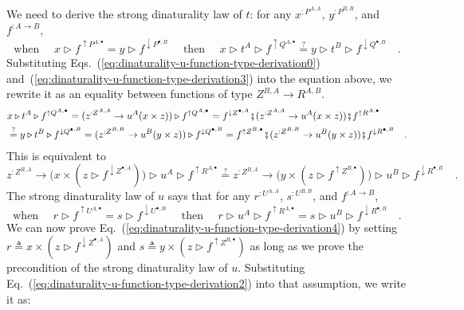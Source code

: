We need to derive the strong dinaturality law of $t$: for any $x^{:P^{A,A}}$,
$y^{:P^{B,B}}$, and $f^{:A\rightarrow B}$,
\[
\text{when }\quad x\triangleright f^{\uparrow P^{A,\bullet}}=y\triangleright f^{\downarrow P^{\bullet,B}}\quad\text{ then }\quad x\triangleright t^{A}\triangleright f^{\uparrow Q^{A,\bullet}}\overset{?}{=}y\triangleright t^{B}\triangleright f^{\downarrow Q^{\bullet,B}}\quad.
\]
Substituting Eqs.~(\ref{eq:dinaturality-u-function-type-derivation0})
and~(\ref{eq:dinaturality-u-function-type-derivation3}) into the
equation above, we rewrite it as an equality between functions of
type $Z^{B,A}\rightarrow R^{A,B}$.
\begin{align*}
 & x\triangleright t^{A}\triangleright f^{\uparrow Q^{A,\bullet}}=(z^{:Z^{A,A}}\rightarrow u^{A}(x\times z))\triangleright f^{\uparrow Q^{A,\bullet}}=f^{\downarrow Z^{\bullet,A}}\bef(z^{:Z^{A,A}}\rightarrow u^{A}(x\times z))\bef f^{\uparrow R^{A,\bullet}}\\
 & \overset{?}{=}y\triangleright t^{B}\triangleright f^{\downarrow Q^{\bullet,B}}=(z^{:Z^{B,B}}\rightarrow u^{B}(y\times z))\triangleright f^{\downarrow Q^{\bullet,B}}=f^{\uparrow Z^{B,\bullet}}\bef(z^{:Z^{B,B}}\rightarrow u^{B}(y\times z))\bef f^{\downarrow R^{\bullet,B}}\quad.
\end{align*}
This is equivalent to
\begin{equation}
z^{:Z^{B,A}}\rightarrow\big(x\times(z\triangleright f^{\downarrow Z^{\bullet,A}})\big)\triangleright u^{A}\triangleright f^{\uparrow R^{A,\bullet}}\overset{?}{=}z^{:Z^{B,A}}\rightarrow\big(y\times(z\triangleright f^{\uparrow Z^{B,\bullet}})\big)\triangleright u^{B}\triangleright f^{\downarrow R^{\bullet,B}}\quad.\label{eq:dinaturality-u-function-type-derivation4}
\end{equation}
The strong dinaturality law of $u$ says that for any $r^{:U^{A,A}}$,
$s^{:U^{B,B}}$, and $f^{:A\rightarrow B}$,
\[
\text{when }\quad r\triangleright f^{\uparrow U^{A,\bullet}}=s\triangleright f^{\downarrow U^{\bullet,B}}\quad\text{ then }\quad r\triangleright u^{A}\triangleright f^{\uparrow R^{A,\bullet}}=s\triangleright u^{B}\triangleright f^{\downarrow R^{\bullet,B}}\quad.
\]
We can now prove Eq.~(\ref{eq:dinaturality-u-function-type-derivation4})
by setting $r\triangleq x\times(z\triangleright f^{\downarrow Z^{\bullet,A}})$
and $s\triangleq y\times(z\triangleright f^{\uparrow Z^{B,\bullet}})$
as long as we prove the precondition of the strong dinaturality law
of $u$. Substituting Eq.~(\ref{eq:dinaturality-u-function-type-derivation2})
into that assumption, we write it as:
